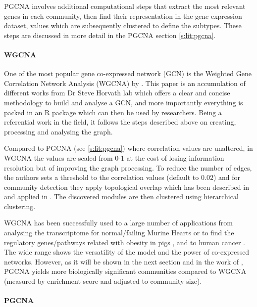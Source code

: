 PGCNA involves additional computational steps that extract the most relevant genes in each community, then find their representation in the gene expression dataset, values which are subsequently clustered to define the subtypes. These steps are discussed in more detail in the PGCNA section \cref{s:lit:pgcna}.


\paragraph*{WGCNA} \label{s:lit:WGCNA}

One of the most popular gene co-expressed network (GCN) is the Weighted Gene Correlation Network Analysis (WGCNA) by \citet{Langfelder2008-sn}. This paper is an accumulation of different works from Dr Steve Horvath lab which offers a clear and concise methodology to build and analyse a GCN, and more importantly everything is packed in an R package which can then be used by researchers. Being a referential work in the field, it follows the steps described above on creating, processing and analysing the graph.

Compared to PGCNA (see \ref{s:lit:pgcna}) where correlation values are unaltered, in WGCNA the values are scaled from 0-1 at the cost of losing information resolution but of improving the graph processing. To reduce the number of edges, the authors sets a threshold to the correlation values (default to $0.02$) and for community detection they apply topological overlap which has been described in \citet{Zhang2005-xq} and applied in \cite{Yip2007-mr, Li2007-vz, Ravasz2002-au}. The discovered modules are then clustered using hierarchical clustering.

WGCNA has been successfully used to a large number of applications from analysing the transcriptome for normal/failing Murine Hearts \citet{Lee2011-wm} or to find the regulatory genes/pathways related with obesity in pigs \citet{Kogelman2014-ea}, and to human cancer \cite{Yang2014-wv, Clarke2013-wd, Care2019-ij}. The wide range shows the versatility of the model and the power of co-expressed networks. However, as it will be shown in the next section and in the work of \citet{Care2019-ij}, PGCNA yields more biologically significant communities compared to WGCNA (measured by enrichment score and adjusted to community size).

\paragraph*{PGCNA} \label{s:lit:pgcna}

